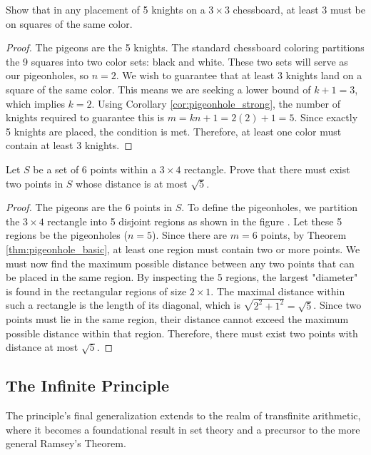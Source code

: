 \begin{proposition}
Show that in any placement of 5 knights on a $3 \times 3$ chessboard, at least 3 must be on squares of the same color.
\end{proposition}
\begin{proof}
The pigeons are the 5 knights. The standard chessboard coloring partitions the 9 squares into two color sets: black and white. These two sets will serve as our pigeonholes, so $n=2$. We wish to guarantee that at least 3 knights land on a square of the same color. This means we are seeking a lower bound of $k+1=3$, which implies $k=2$.
Using Corollary \ref{cor:pigeonhole_strong}, the number of knights required to guarantee this is $m = kn+1 = 2(2)+1 = 5$. Since exactly 5 knights are placed, the condition is met. Therefore, at least one color must contain at least 3 knights.
\end{proof}

\begin{proposition}
Let $S$ be a set of 6 points within a $3 \times 4$ rectangle. Prove that there must exist two points in $S$ whose distance is at most $\sqrt{5}$.
\end{proposition}
\begin{proof}
The pigeons are the 6 points in $S$. To define the pigeonholes, we partition the $3 \times 4$ rectangle into 5 disjoint regions as shown in the figure .
Let these 5 regions be the pigeonholes ($n=5$). Since there are $m=6$ points, by Theorem \ref{thm:pigeonhole_basic}, at least one region must contain two or more points. We must now find the maximum possible distance between any two points that can be placed in the same region. By inspecting the 5 regions, the largest "diameter" is found in the rectangular regions of size $2 \times 1$. The maximal distance within such a rectangle is the length of its diagonal, which is $\sqrt{2^2 + 1^2} = \sqrt{5}$.
Since two points must lie in the same region, their distance cannot exceed the maximum possible distance within that region. Therefore, there must exist two points with distance at most $\sqrt{5}$.
\end{proof}

\subsection{The Infinite Principle}

The principle's final generalization extends to the realm of transfinite arithmetic, where it becomes a foundational result in set theory and a precursor to the more general Ramsey's Theorem.

